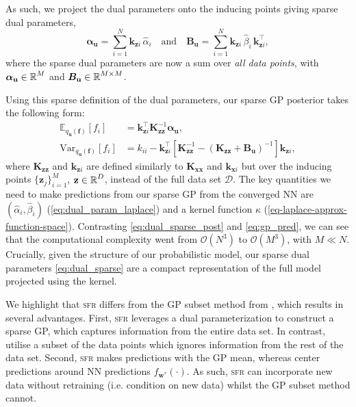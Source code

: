 \documentclass{article}
\newcommand{\our}{\textsc{sfr}\xspace}
\newcommand{\dataset}{\ensuremath{\mathcal{D}}}
\newcommand{\mathbold}[1]{\bm{#1}}
\newcommand{\mbf}[1]{\mathbf{#1}}
\newcommand{\T}{\top}
\newcommand{\valpha}[0]{\mathbold{\alpha}}
\newcommand{\MBeta}[0]{\mathbold{B}}
\newcommand{\vz}{\mbf{z}}
\newcommand{\vf}{\mbf{f}}
\newcommand{\vu}{\mbf{u}}
\newcommand{\vx}{\mbf{x}}
\newcommand{\vw}{\mbf{w}}
\newcommand{\MKzz}{\mbf{K}_{\mbf{z}\mbf{z}}}
\newcommand{\MKxx}{\mbf{K}_{\mbf{x}\mbf{x}}}
\newcommand{\vkzi}{\mbf{k}_{\mbf{z}i}}
\newcommand{\vkzs}{\mbf{k}_{\mbf{z}i}}
\newcommand{\vk}{\mbf{k}}
\newcommand{\myexpect}{\mathbb{E}}
\begin{document}
As such, we project the dual parameters onto the inducing points giving sparse dual parameters,
%
\begin{equation} \textstyle
  \valpha_{\vu}  =  \sum_{i=1}^N  \vkzi \, \hat{\alpha}_{i}
  \quad \text{and} \quad
  \MBeta_{\vu} =  \sum_{i=1}^N \vkzi \,\hat{\beta}_{i} \, \vkzi^{\T} ,
\label{eq:dual_sparse}
\end{equation}
%
where the sparse dual parameters are now a sum over \emph{all data points}, with $\valpha_{\vu} \in \R^{M}$ and $\MBeta_{\vu} \in \R^{M  \times M}$.

Using this sparse definition of the dual parameters, our sparse GP posterior takes the following form:
\begin{subequations} \label{eq:dual_sparse_post}
\begin{align}
   \myexpect_{q_{\vu}(\vf)}[f_i] &= \vkzs^{\T} \MKzz^{-1} \valpha_{\vu}, \\
   \textrm{Var}_{q_{\vu}(\vf)}[f_i]  &= k_{ii} - \vkzs^\top [\MKzz^{-1} - (\MKzz + \MBeta_{\vu})^{-1} ]\vkzs, \nonumber
\end{align}
\end{subequations}
where $\MKzz$ and $\vkzs$ are defined similarly to $\MKxx$ and $\vk_{\vx i}$ but over the inducing points $\{\vz_j\}_{i=1}^M$, $\vz \in \R^{D}$, instead of the full data set $\dataset$. The key quantities we need to make predictions from our sparse GP from the converged NN are $(\hat{\alpha}_i, \hat{\beta}_i)$ (\cref{eq:dual_param_laplace}) and a kernel function $\kappa$ (\cref{eq-laplace-approx-function-space}). Contrasting \cref{eq:dual_sparse_post} and \cref{eq:gp_pred}, we can see that the computational complexity went from $\mathcal{O}(N^3)$ to $\mathcal{O}(M^3)$, with $M \ll N$.  Crucially, given the structure of our probabilistic model, our sparse dual parameters \cref{eq:dual_sparse} are a compact representation of the full model projected using the kernel.


We highlight that \our differs from the GP subset method from \citet{immer2021improving}, which results in several advantages.
First, \our leverages a dual parameterization to construct a sparse GP, which captures information from the entire data set.
In contrast, \citet{immer2021improving} utilise a subset of the data points which ignores information from the rest of the data set.
Second, \our makes predictions with the GP mean, whereas \citet{immer2021improving} center predictions around NN predictions $f_{\vw^*}(\cdot)$.
As such, \our can incorporate new data without retraining (i.e. condition on new data) whilst the GP subset method cannot.
\end{document}
